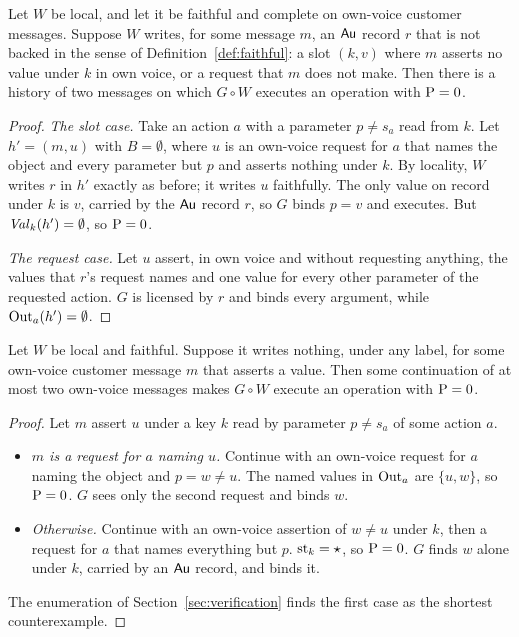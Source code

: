 \begin{theorem}\label{thm:necessary}
Let $W$ be local, and let it be faithful and complete on own-voice customer messages. Suppose $W$
writes, for some message $m$, an $\mathsf{Au}$ record $r$ that is not backed in the sense of
Definition~\ref{def:faithful}: a slot $(k, v)$ where $m$ asserts no value under $k$ in own
voice, or a request that $m$ does not make. Then there is a history of two messages on which $G \circ W$ executes
an operation with $\mathrm{P} = 0$.
\end{theorem}
\begin{proof}
\emph{The slot case.} Take an action $a$ with a parameter $p \neq s_a$ read from $k$. Let
$h' = (m, u)$ with $B = \emptyset$, where $u$ is an own-voice request for $a$ that names the object
and every parameter but $p$ and asserts nothing under $k$. By locality, $W$ writes $r$ in $h'$
exactly as before; it writes $u$ faithfully. The only value on record under $k$ is $v$, carried by
the $\mathsf{Au}$ record $r$, so $G$ binds $p = v$ and executes. But $\mathit{Val}_k(h') = \emptyset$, so
$\mathrm{P} = 0$.

\emph{The request case.} Let $u$ assert, in own voice and without requesting anything, the values
that $r$'s request names and one value for every other parameter of the requested action. $G$ is licensed by $r$ and binds
every argument, while $\mathrm{Out}_a(h') = \emptyset$.
\end{proof}

\begin{theorem}\label{thm:complete-necessary}
Let $W$ be local and faithful. Suppose it writes nothing, under any label, for some own-voice
customer message $m$ that asserts a value. Then some continuation of at most two own-voice messages
makes $G \circ W$ execute an operation with $\mathrm{P} = 0$.
\end{theorem}
\begin{proof}
Let $m$ assert $u$ under a key $k$ read by parameter $p \neq s_a$ of some action $a$.
\begin{itemize}
\item \emph{$m$ is a request for $a$ naming $u$.} Continue with an own-voice request for $a$ naming
  the object and $p = w \neq u$. The named values in $\mathrm{Out}_a$ are $\{u, w\}$, so $\mathrm{P} = 0$. $G$
  sees only the second request and binds $w$.
\item \emph{Otherwise.} Continue with an own-voice assertion of $w \neq u$ under $k$, then a request
  for $a$ that names everything but $p$. $\mathrm{st}_k = \star$, so $\mathrm{P} = 0$. $G$ finds $w$ alone
  under $k$, carried by an $\mathsf{Au}$ record, and binds it.
\end{itemize}
The enumeration of Section~\ref{sec:verification} finds the first case as the shortest
counterexample.
\end{proof}

